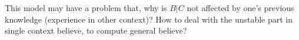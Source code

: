 








This model may have a problem that, why is $B|C$ not affected by one's previous knowledge (experience in other context)?
How to deal with the unstable part in single context believe, to compute general believe?


